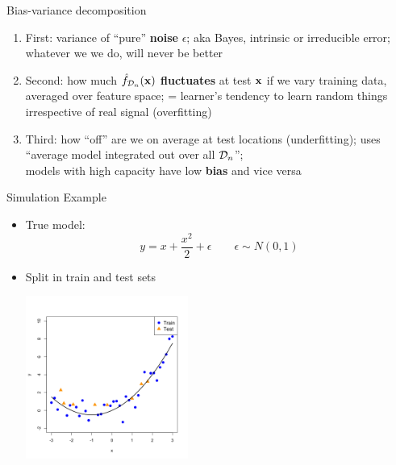 \documentclass[11pt,compress,t,notes=noshow, xcolor=table]{beamer}
\begin{document}
\begin{vbframe} {Bias-variance decomposition}
\begin{enumerate}
  \item First: variance of ``pure''
     \textbf{noise} $\epsilon$; aka Bayes, intrinsic or irreducible error; 
    whatever we we do, will never be better
  \item Second: how much \textbf{$\hat{f}_{\mathcal{D}_n}(\mathbf{x})$ fluctuates} at test $\mathbf{x}$ if we vary training data, averaged over feature space; = learner's tendency to learn random things irrespective of real signal (overfitting)
  
  \item Third: how ``off'' are we on average at test locations (underfitting); uses ``average model integrated out over all $\mathcal{D}_n$''; \\
  models with high capacity have low \textbf{bias} and vice versa
\end{enumerate}


\end{vbframe} 

\begin{vbframe} {Simulation Example}

\begin{itemize}
\item True model:
$$y = x + \frac{x^2}{2} + \epsilon  \qquad \epsilon \sim 
N (0, 1)$$
\item Split in train and test sets 
\begin{center}
  \includegraphics[width = 0.42\textwidth]{figure/bias_variance_decomposition-train_test.png}
\end{center}

\end{itemize}

\end{vbframe} 
\end{document}
